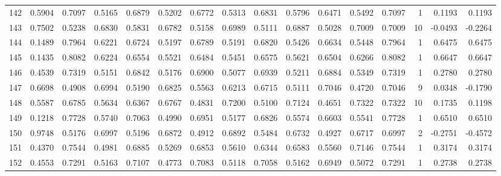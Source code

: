 \begin{tabular}{lrrrrrrrrrrrrrrr}
142 &      0.5904 &  0.7097 &  0.5165 &  0.6879 &  0.5202 &  0.6772 &  0.5313 &  0.6831 &  0.5796 &  0.6471 &   0.5492 &     0.7097 &      1 &                    0.1193 &                     0.1193 \\
143 &      0.7502 &  0.5238 &  0.6830 &  0.5831 &  0.6782 &  0.5158 &  0.6989 &  0.5111 &  0.6887 &  0.5028 &   0.7009 &     0.7009 &     10 &                   -0.0493 &                    -0.2264 \\
144 &      0.1489 &  0.7964 &  0.6221 &  0.6724 &  0.5197 &  0.6789 &  0.5191 &  0.6820 &  0.5426 &  0.6634 &   0.5448 &     0.7964 &      1 &                    0.6475 &                     0.6475 \\
145 &      0.1435 &  0.8082 &  0.6224 &  0.6554 &  0.5521 &  0.6484 &  0.5451 &  0.6575 &  0.5621 &  0.6504 &   0.6266 &     0.8082 &      1 &                    0.6647 &                     0.6647 \\
146 &      0.4539 &  0.7319 &  0.5151 &  0.6842 &  0.5176 &  0.6900 &  0.5077 &  0.6939 &  0.5211 &  0.6884 &   0.5349 &     0.7319 &      1 &                    0.2780 &                     0.2780 \\
147 &      0.6698 &  0.4908 &  0.6994 &  0.5190 &  0.6825 &  0.5563 &  0.6213 &  0.6715 &  0.5111 &  0.7046 &   0.4720 &     0.7046 &      9 &                    0.0348 &                    -0.1790 \\
148 &      0.5587 &  0.6785 &  0.5634 &  0.6367 &  0.6767 &  0.4831 &  0.7200 &  0.5100 &  0.7124 &  0.4651 &   0.7322 &     0.7322 &     10 &                    0.1735 &                     0.1198 \\
149 &      0.1218 &  0.7728 &  0.5740 &  0.7063 &  0.4990 &  0.6951 &  0.5177 &  0.6826 &  0.5574 &  0.6603 &   0.5541 &     0.7728 &      1 &                    0.6510 &                     0.6510 \\
150 &      0.9748 &  0.5176 &  0.6997 &  0.5196 &  0.6872 &  0.4912 &  0.6892 &  0.5484 &  0.6732 &  0.4927 &   0.6717 &     0.6997 &      2 &                   -0.2751 &                    -0.4572 \\
151 &      0.4370 &  0.7544 &  0.4981 &  0.6885 &  0.5269 &  0.6853 &  0.5610 &  0.6344 &  0.6583 &  0.5560 &   0.7146 &     0.7544 &      1 &                    0.3174 &                     0.3174 \\
152 &      0.4553 &  0.7291 &  0.5163 &  0.7107 &  0.4773 &  0.7083 &  0.5118 &  0.7058 &  0.5162 &  0.6949 &   0.5072 &     0.7291 &      1 &                    0.2738 &                     0.2738 \\

\end{tabular}
